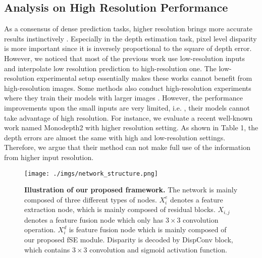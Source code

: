 \documentclass[letterpaper]{article} \usepackage{aaai21}  \usepackage{times}  \usepackage{helvet} \usepackage{courier}  \usepackage[hyphens]{url}  \usepackage{graphicx} \urlstyle{rm} \def\UrlFont{\rm}  \usepackage{natbib}  \usepackage{caption} \frenchspacing  \setlength{\pdfpagewidth}{8.5in}  \setlength{\pdfpageheight}{11in}  \usepackage{booktabs}
\begin{document}
\subsection{Analysis on High Resolution Performance}
As a consensus of dense prediction tasks, higher resolution brings more accurate results instinctively \cite{Sun_2019_CVPR, zhou2019unsupervised}. Especially in the depth estimation task, pixel level disparity is more important since 
it is inversely proportional to the square of depth error\cite{you2019pseudo}. However, we noticed that most of the previous work use low-resolution inputs and interpolate low 
resolution prediction to high-resolution one. The low-resolution experimental setup essentially makes these works cannot benefit from high-resolution images. Some methods also 
conduct high-resolution experiments where they train their models with larger images \cite{godard2019digging, superdepth}. However, the performance improvements upon the small 
inputs are very limited, i.e. \cite{superdepth}, their models cannot take advantage of high resolution. For instance, we evaluate a recent well-known work named 
Monodepth2\cite{godard2019digging} with higher resolution setting. As shown in Table 1, the depth errors are almost the same with high and low-resolution settings. 
Therefore, we argue that their method can not make full use of the information from higher input resolution.

\begin{figure*}[ht]
    \centering
    \texttt{[image: ./imgs/network\_structure.png]} 
    \caption{\textbf{Illustration of our proposed framework.} The network is mainly composed of three different types of nodes. $X^{e}_i$ denotes a feature extraction node, which is mainly composed
    of residual blocks. $X_{i,j}$ denotes a feature fusion node which only has $3\times3$ convolution operation. $X^{d}_i$ is feature fusion node which is mainly composed of our proposed fSE module. Disparity is decoded
    by DispConv block, which contains $3\times3$ convolution and sigmoid activation function. }
\label{fig3}
\end{figure*}
\begin{table}[ht]
    \caption{\textbf{Quantitative results from Monodepth2 with different resolution setting training and testing.}}
    \label{tab:1}
\end{table}
\end{document}
